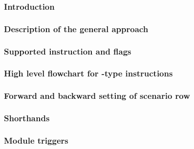
\subsubsection{Introduction                                              \lispNone{}}    \label{hub: instruction handling: call: intro}                                     
\subsubsection{Description of the general approach                       \lispNone{}}    \label{hub: instruction handling: call: general approach}                          
\subsubsection{Supported instruction and flags                           \lispNone{}}    \label{hub: instruction handling: call: instruction flags}                         
\subsubsection{High level flowchart for -type instructions    \lispNone{}}    \label{hub: instruction handling: call: high level flowchart}                      
\subsubsection{Forward and backward setting of scenario row              \lispDone{}}    \label{hub: instruction handling: call: scenario bedrock}                          
\subsubsection{Shorthands                                                \lispDone{}}    \label{hub: instruction handling: call: shorthands}                                
\subsubsection{Module triggers                                           \lispDone{}}    \label{hub: instruction handling: call: module triggers}                           
